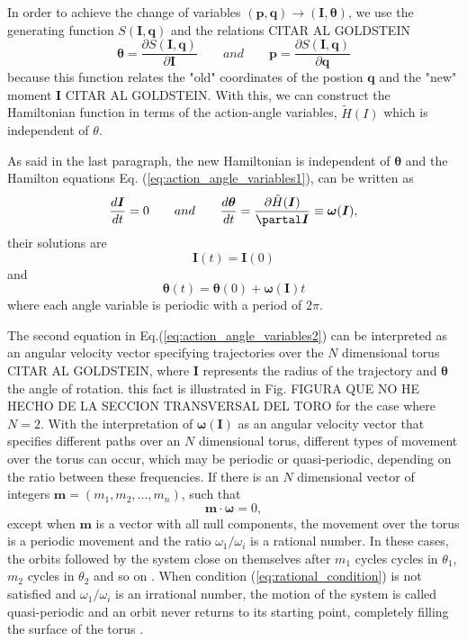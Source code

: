 In order to achieve the change of variables $(\bm{p},\bm{q})\rightarrow (\bm{I},\bm{\theta})$, we use the generating function $S(\bm{I},\bm{q})$ and the relations CITAR AL GOLDSTEIN
\begin{equation}
\bm{\theta}=\frac{\partial S(\bm{I},\bm{q})}{\partial \bm{I}} \qquad and\qquad \bm{p}=\frac{\partial S(\bm{I},\bm{q})}{\partial \bm{q}}
\end{equation}
because this function relates the "old" coordinates of the postion $\bm{q}$ and the "new" moment $\bm{I}$ CITAR AL GOLDSTEIN. With this, we can construct the Hamiltonian function in terms of the action-angle variables, $\tilde{H}(I)$ which is independent of $\theta$.\par

As said in the last paragraph, the new Hamiltonian is independent of $\bm{\theta}$ and the Hamilton equations Eq. (\ref{eq:action_angle_variables1}), can be written as 
\begin{equation}
\frac{d\bm{I}}{dt}=0 \qquad and \qquad \frac{d\bm{\theta}}{dt}=\frac{\partial \tilde{H}(\bm{I})}{\partal \bm{I}}\equiv \bm{\omega}(\bm{I}),
\label{eq:action_angle_variables2}
\end{equation}
their solutions are
\begin{equation}
\bm{I}(t)=\bm{I}(0)
\end{equation}
and
\begin{equation}
\bm{\theta}(t)=\bm{\theta}(0)+\bm{\omega}(\bm{I})t
\end{equation}
where each angle variable is periodic with a period of $2\pi$.\par

The second equation in Eq.(\ref{eq:action_angle_variables2}) can be interpreted as an angular velocity vector specifying trajectories over the $N$ dimensional torus CITAR AL GOLDSTEIN, where $\bm{I}$ represents the radius of the trajectory and $\bm{\theta}$ the angle of rotation. this fact is illustrated in Fig. FIGURA QUE NO HE HECHO DE LA SECCION TRANSVERSAL DEL TORO for the case where $N=2$. With the interpretation of $\bm{\omega}(\bm{I})$ as an angular velocity vector that specifies different paths over an $N$ dimensional torus, different types of movement over the torus can occur, which may be periodic or quasi-periodic, depending on the ratio between these frequencies. If there is an $N$ dimensional vector of integers $\bm{m}=(m_1,m_2,...,m_n)$, such that
\begin{equation}
\bm{m}\cdot \bm{\omega}=0,
\label{eq:rational_condition}
\end{equation}
except when $\bm{m}$ is a vector with all null components, the movement over the torus is a periodic movement and the ratio $\omega_1/\omega_i$ is a rational number. In these cases, the orbits followed by the system close on themselves after $m_1$ cycles cycles in $\theta_1$, $m_2$ cycles in $\theta_2$ and so on \cite{ottChaosDynamicalSystems2002}. When condition (\ref{eq:rational_condition}) is not satisfied and $\omega_1/\omega_i$ is an irrational number, the motion of the system is called quasi-periodic and an orbit never returns to its starting point, completely filling the surface of the torus \cite{ottChaosDynamicalSystems2002}.\par

